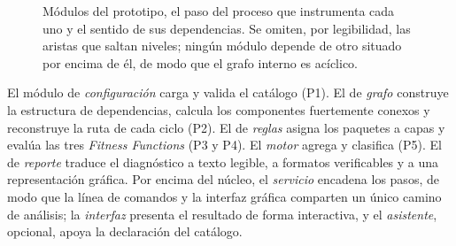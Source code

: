 \begin{figure}[tbp]
\centering
{}
\caption{Módulos del prototipo, el paso del proceso que instrumenta cada uno y el sentido de sus dependencias. Se omiten, por legibilidad, las aristas que saltan niveles; ningún módulo depende de otro situado por encima de él, de modo que el grafo interno es acíclico.}
\label{fig:modulos}
\end{figure}

El módulo de \textit{configuración} carga y valida el catálogo (P1). El de \textit{grafo} construye la estructura de dependencias, calcula los componentes fuertemente conexos y reconstruye la ruta de cada ciclo (P2). El de \textit{reglas} asigna los paquetes a capas y evalúa las tres \textit{Fitness Functions} (P3 y P4). El \textit{motor} agrega y clasifica (P5). El de \textit{reporte} traduce el diagnóstico a texto legible, a formatos verificables y a una representación gráfica. Por encima del núcleo, el \textit{servicio} encadena los pasos, de modo que la línea de comandos y la interfaz gráfica comparten un único camino de análisis; la \textit{interfaz} presenta el resultado de forma interactiva, y el \textit{asistente}, opcional, apoya la declaración del catálogo.

